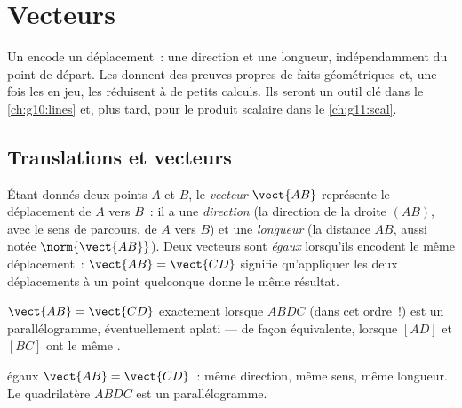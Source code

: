 \chapter{Vecteurs}\label{ch:g10:vectors}

Un  encode un déplacement~: une direction et une longueur,
indépendamment du point de départ. Les  donnent des preuves
propres de faits géométriques et, une fois les  en jeu, les
réduisent à de petits calculs. Ils seront un outil clé dans le
\cref{ch:g10:lines} et, plus tard, pour le produit scalaire dans le
\cref{ch:g11:scal}.

\section{Translations et vecteurs}

\begin{definition}[Vecteur]\label{def:g10:vectors:vector}
Étant donnés deux points $A$ et $B$, le \emph{vecteur}
$\vect{AB}$ représente le déplacement de $A$ vers $B$~: il a une
\emph{direction} (la direction de la droite $(AB)$, avec le sens de
parcours, de $A$ vers $B$) et une \emph{longueur} (la distance $AB$,
aussi notée $\norm{\vect{AB}}$). Deux vecteurs sont \emph{égaux}
lorsqu'ils encodent le même déplacement~: $\vect{AB} = \vect{CD}$
signifie qu'appliquer les deux déplacements à un point quelconque donne
le même résultat.
\end{definition}

\begin{proposition}\label{prop:g10:vectors:parallelogram}
$\vect{AB} = \vect{CD}$ exactement lorsque $ABDC$ (dans cet ordre~!) est
un parallélogramme, éventuellement aplati --- de façon équivalente,
lorsque $[AD]$ et $[BC]$ ont le même .
\end{proposition}
\admitted

\begin{omfigure}

{\small {} égaux $\vect{AB} = \vect{CD}$~: même direction, même
sens, même longueur. Le quadrilatère $ABDC$ est un parallélogramme.}
\end{omfigure}

